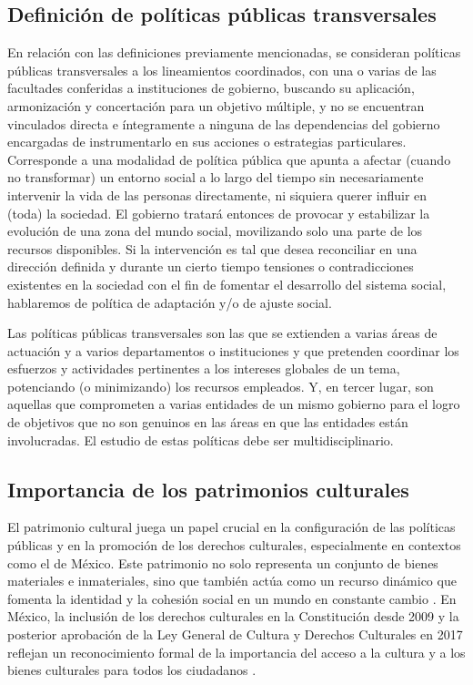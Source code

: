 \documentclass[
  spanish,
  11pt,
  a4paper,
]{scrbook}
\begin{document}
\subsection*{Definición de políticas públicas
transversales}\label{definiciuxf3n-de-poluxedticas-puxfablicas-transversales}

En relación con las definiciones previamente mencionadas, se consideran
políticas públicas transversales a los lineamientos coordinados, con una
o varias de las facultades conferidas a instituciones de gobierno,
buscando su aplicación, armonización y concertación para un objetivo
múltiple, y no se encuentran vinculados directa e íntegramente a ninguna
de las dependencias del gobierno encargadas de instrumentarlo en sus
acciones o estrategias particulares. Corresponde a una modalidad de
política pública que apunta a \textquotesingle afectar\textquotesingle{}
(cuando no \textquotesingle transformar\textquotesingle) un entorno
social a lo largo del tiempo sin necesariamente intervenir la vida de
las personas directamente, ni siquiera querer influir en (toda) la
sociedad. El gobierno tratará entonces de provocar y estabilizar la
evolución de una zona del mundo social, movilizando solo una parte de
los recursos disponibles. Si la intervención es tal que desea
reconciliar en una dirección definida y durante un cierto tiempo
tensiones o contradicciones existentes en la sociedad con el fin de
fomentar el desarrollo del sistema social, hablaremos de política de
adaptación y/o de ajuste social.

Las políticas públicas transversales son las que se extienden a varias
áreas de actuación y a varios departamentos o instituciones y que
pretenden coordinar los esfuerzos y actividades pertinentes a los
intereses globales de un tema, potenciando (o minimizando) los recursos
empleados. Y, en tercer lugar, son aquellas que comprometen a varias
entidades de un mismo gobierno para el logro de objetivos que no son
genuinos en las áreas en que las entidades están involucradas. El
estudio de estas políticas debe ser multidisciplinario.

\subsection*{Importancia de los patrimonios
culturales}\label{importancia-de-los-patrimonios-culturales}

El patrimonio cultural juega un papel crucial en la configuración de las
políticas públicas y en la promoción de los derechos culturales,
especialmente en contextos como el de México. Este patrimonio no solo
representa un conjunto de bienes materiales e inmateriales, sino que
también actúa como un recurso dinámico que fomenta la identidad y la
cohesión social en un mundo en constante cambio
\autocite{CantuMartinez2018,BecerraMoreno2023}. En México, la inclusión
de los derechos culturales en la Constitución desde 2009 y la posterior
aprobación de la Ley General de Cultura y Derechos Culturales en 2017
reflejan un reconocimiento formal de la importancia del acceso a la
cultura y a los bienes culturales para todos los ciudadanos
\autocite{Arteaga2016}.
\end{document}

